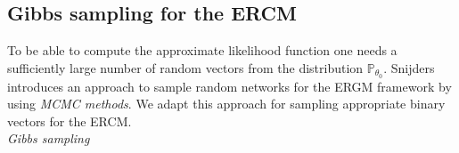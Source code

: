 \documentclass[headsepline=true, abstracton]{scrartcl}
\begin{document}
\subsection*{Gibbs sampling for the ERCM}
To be able to compute the approximate likelihood function one needs a sufficiently large number of random vectors from the distribution $\mathbb{P}_{\theta_0}$. Snijders \cite{Snijders.2002b} introduces an approach to sample random networks for the ERGM framework by using \textit{MCMC methods}. We adapt this approach for sampling appropriate binary vectors for the ERCM. \\[0.4cm]
\textit{Gibbs sampling}\\
\end{document}
